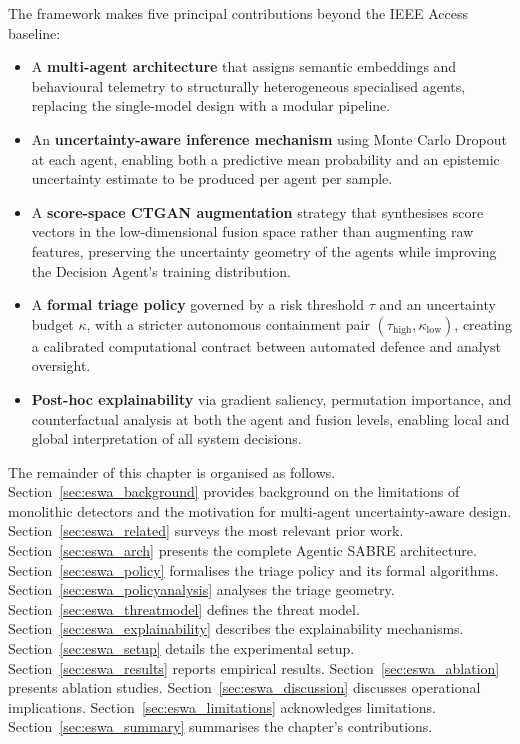 The framework makes five principal contributions beyond the IEEE Access baseline:
\begin{itemize}
    \item A \textbf{multi-agent architecture} that assigns semantic embeddings and behavioural telemetry to structurally heterogeneous specialised agents, replacing the single-model design with a modular pipeline.
    \item An \textbf{uncertainty-aware inference mechanism} using Monte Carlo Dropout at each agent, enabling both a predictive mean probability and an epistemic uncertainty estimate to be produced per agent per sample.
    \item A \textbf{score-space CTGAN augmentation} strategy that synthesises score vectors in the low-dimensional fusion space rather than augmenting raw features, preserving the uncertainty geometry of the agents while improving the Decision Agent's training distribution.
    \item A \textbf{formal triage policy} governed by a risk threshold $\tau$ and an uncertainty budget $\kappa$, with a stricter autonomous containment pair $(\tau_\text{high}, \kappa_\text{low})$, creating a calibrated computational contract between automated defence and analyst oversight.
    \item \textbf{Post-hoc explainability} via gradient saliency, permutation importance, and counterfactual analysis at both the agent and fusion levels, enabling local and global interpretation of all system decisions.
\end{itemize}

The remainder of this chapter is organised as follows. Section~\ref{sec:eswa_background} provides background on the limitations of monolithic detectors and the motivation for multi-agent uncertainty-aware design. Section~\ref{sec:eswa_related} surveys the most relevant prior work. Section~\ref{sec:eswa_arch} presents the complete Agentic SABRE architecture. Section~\ref{sec:eswa_policy} formalises the triage policy and its formal algorithms. Section~\ref{sec:eswa_policyanalysis} analyses the triage geometry. Section~\ref{sec:eswa_threatmodel} defines the threat model. Section~\ref{sec:eswa_explainability} describes the explainability mechanisms. Section~\ref{sec:eswa_setup} details the experimental setup. Section~\ref{sec:eswa_results} reports empirical results. Section~\ref{sec:eswa_ablation} presents ablation studies. Section~\ref{sec:eswa_discussion} discusses operational implications. Section~\ref{sec:eswa_limitations} acknowledges limitations. Section~\ref{sec:eswa_summary} summarises the chapter's contributions.


